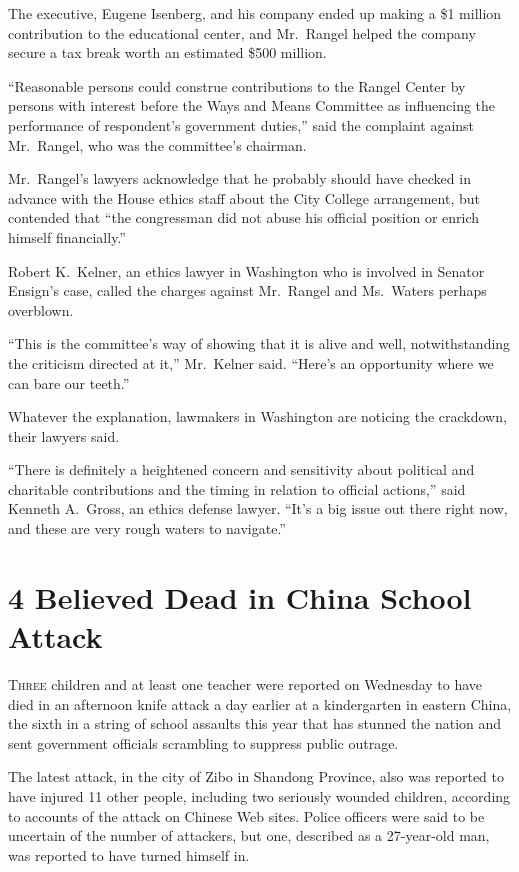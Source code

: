 ﻿\documentclass[12pt]{article}
\begin{document}
The executive, Eugene Isenberg, and his company ended up making a \$1 million contribution to the
educational center, and Mr.~Rangel helped the company secure a tax break worth an estimated \$500
million.

``Reasonable persons could construe contributions to the Rangel Center by persons with interest
before the Ways and Means Committee as influencing the performance of respondent's government
duties,'' said the complaint against Mr.~Rangel, who was the committee's chairman.

Mr.~Rangel's lawyers acknowledge that he probably should have checked in advance with the House
ethics staff about the City College arrangement, but contended that ``the congressman did not abuse
his official position or enrich himself financially.''

Robert K.~Kelner, an ethics lawyer in Washington who is involved in Senator Ensign's case, called
the charges against Mr.~Rangel and Ms.~Waters perhaps overblown.

``This is the committee's way of showing that it is alive and well, notwithstanding the criticism
directed at it,'' Mr.~Kelner said. ``Here's an opportunity where we can bare our teeth.''

Whatever the explanation, lawmakers in Washington are noticing the crackdown, their lawyers said.

``There is definitely a heightened concern and sensitivity about political and charitable
contributions and the timing in relation to official actions,'' said Kenneth A.~Gross, an ethics
defense lawyer. ``It's a big issue out there right now, and these are very rough waters to
navigate.''

\section{4 Believed Dead in China School Attack}

\lettrine{T}{hree} children and at least one teacher were reported on
Wednesday to have died in an afternoon knife attack a day earlier at a kindergarten in eastern
China, the sixth in a string of school assaults this year that has stunned the nation and sent
government officials scrambling to suppress public outrage.

The latest attack, in the city of Zibo in Shandong Province, also was reported to have injured 11
other people, including two seriously wounded children, according to accounts of the attack on
Chinese Web sites. Police officers were said to be uncertain of the number of attackers, but one,
described as a 27-year-old man, was reported to have turned himself in.
\end{document}
